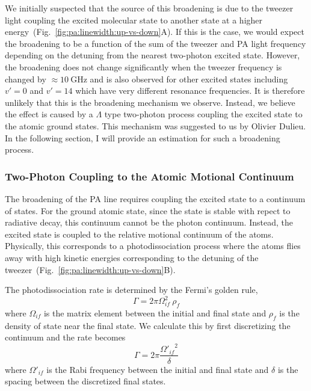 We initially suspected that the source of this broadening is due to the tweezer light
coupling the excited molecular state to another state at
a higher energy~(Fig.~\ref{fig:pa:linewidth:up-vs-down}A).
If this is the case, we would expect the broadening to be a function of
the sum of the tweezer and PA light frequency depending on the detuning from the nearest
two-photon excited state.
However, the broadening does not change significantly when the tweezer frequency
is changed by $\approx\!10~\mathrm{GHz}$ and
is also observed for other excited states including $v'=0$ and $v'=14$
which have very different resonance frequencies.
It is therefore unlikely that this is the broadening mechanism we observe.
Instead, we believe the effect is caused by a $\Lambda$ type two-photon process
coupling the excited state to the atomic ground states.
This mechanism was suggested to us by Olivier Dulieu.
In the following section, I will provide an estimation for such a broadening process.

\subsubsection{Two-Photon Coupling to the Atomic Motional Continuum}
\label{ch:pa:linewidth:two-photn-down}
The broadening of the PA line requires coupling the excited state to a continuum of states.
For the ground atomic state, since the state is stable with repect to radiative decay,
this continuum cannot be the photon continuum.
Instead, the excited state is coupled to the relative motional continuum of the atoms.
Physically, this corresponds to a photodissociation process
where the atoms flies away with high kinetic energies corresponding
to the detuning of the tweezer~(Fig.~\ref{fig:pa:linewidth:up-vs-down}B).

The photodissociation rate is determined by the Fermi's golden rule,
\[
  \Gamma=2\pi\Omega_{if}^2\ \rho_f
\]
where $\Omega_{if}$ is the matrix element between the initial and final state
and $\rho_f$ is the density of state near the final state.
We calculate this by first discretizing the continuum and the rate becomes
\[
  \Gamma=2\pi\frac{{\Omega'_{if}}^2}{\delta}
\]
where $\Omega'_{if}$ is the Rabi frequency between the initial and final state
and $\delta$ is the spacing between the discretized final states.

